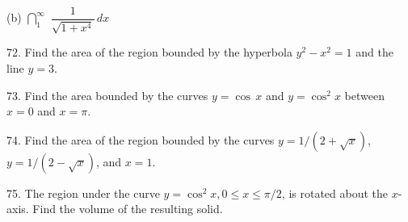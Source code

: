 \documentclass{sebase}
\begin{document}
\begin{multicols}{2}
\begin{ExerciseList}
\begin{ExerciseList}
\item[(b)] $\dint\nolimits_{1}^{\infty }\,\,\dfrac{1}{\sqrt{1+x^{4}}}\,dx$
\end{ExerciseList}

%

\item[\hfill 72.] Find the area of the region bounded by the hyperbola 
\newline
$y^{2}-x^{2}=1$ and the line $y=3$.

%

\item[\hfill 73.] Find the area bounded by the curves $y=\cos \,x$ and $%
y=\cos ^{2}x$ between $x=0$ and $x=\pi $.

%

%

\item[\hfill 74.] Find the area of the region bounded by the curves \newline
$y=1/(2+\sqrt{x})$, $y=1/(2-\sqrt{x})$, and $x=1$.

%

\item[\hfill 75.] The region under the curve $y=\cos ^{2}x,0\leq x\leq \pi /2
$, is rotated about the $x$-axis. Find the volume of the resulting solid.

%

%


\end{ExerciseList}
\end{multicols}
\end{document}
